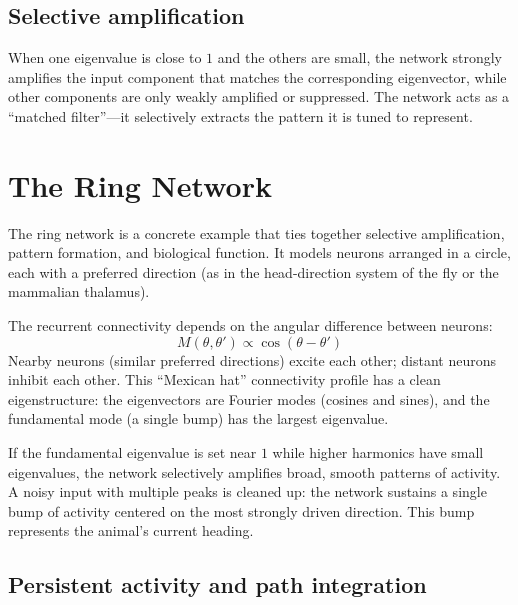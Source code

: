 \subsection{Selective amplification}

When one eigenvalue is close to $1$ and the others are small, the network strongly amplifies the input component that matches the corresponding eigenvector, while other components are only weakly amplified or suppressed. The network acts as a ``matched filter''---it selectively extracts the pattern it is tuned to represent.

\section{The Ring Network}
\label{sec:ring-network}

The ring network is a concrete example that ties together selective amplification, pattern formation, and biological function. It models neurons arranged in a circle, each with a preferred direction (as in the head-direction system of the fly or the mammalian thalamus).

The recurrent connectivity depends on the angular difference between neurons:
%
\begin{equation}
  M(\theta, \theta') \propto \cos(\theta - \theta')
  \label{eq:ring-connectivity}
\end{equation}
%
Nearby neurons (similar preferred directions) excite each other; distant neurons inhibit each other. This ``Mexican hat'' connectivity profile has a clean eigenstructure: the eigenvectors are Fourier modes (cosines and sines), and the fundamental mode (a single bump) has the largest eigenvalue.

If the fundamental eigenvalue is set near $1$ while higher harmonics have small eigenvalues, the network selectively amplifies broad, smooth patterns of activity. A noisy input with multiple peaks is cleaned up: the network sustains a single bump of activity centered on the most strongly driven direction. This bump represents the animal's current heading.

\subsection{Persistent activity and path integration}

